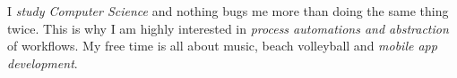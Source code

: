 I \emph{study Computer Science} and nothing bugs me more than doing the same thing twice. This is why I am highly interested in \emph{process automations and abstraction} of workflows. My free time is all about music, beach volleyball and \emph{mobile app development}.